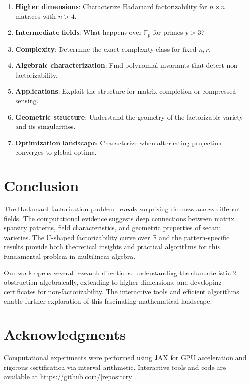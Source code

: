 \documentclass{article}
\theoremstyle{definition}
\begin{document}
\begin{enumerate}
\item \textbf{Higher dimensions}: Characterize Hadamard factorizability for $n \times n$ matrices with $n > 4$.

\item \textbf{Intermediate fields}: What happens over $\mathbb{F}_p$ for primes $p > 3$?

\item \textbf{Complexity}: Determine the exact complexity class for fixed $n,r$.

\item \textbf{Algebraic characterization}: Find polynomial invariants that detect non-factorizability.

\item \textbf{Applications}: Exploit the structure for matrix completion or compressed sensing.

\item \textbf{Geometric structure}: Understand the geometry of the factorizable variety and its singularities.

\item \textbf{Optimization landscape}: Characterize when alternating projection converges to global optima.
\end{enumerate}

\section{Conclusion}

The Hadamard factorization problem reveals surprising richness across different fields. The computational evidence suggests deep connections between matrix sparsity patterns, field characteristics, and geometric properties of secant varieties. The U-shaped factorizability curve over $\mathbb{R}$ and the pattern-specific results provide both theoretical insights and practical algorithms for this fundamental problem in multilinear algebra.

Our work opens several research directions: understanding the characteristic 2 obstruction algebraically, extending to higher dimensions, and developing certificates for non-factorizability. The interactive tools and efficient algorithms enable further exploration of this fascinating mathematical landscape.

\section*{Acknowledgments}

Computational experiments were performed using JAX for GPU acceleration and rigorous certification via interval arithmetic. Interactive tools and code are available at \url{https://github.com/[repository]}.



\end{document}
